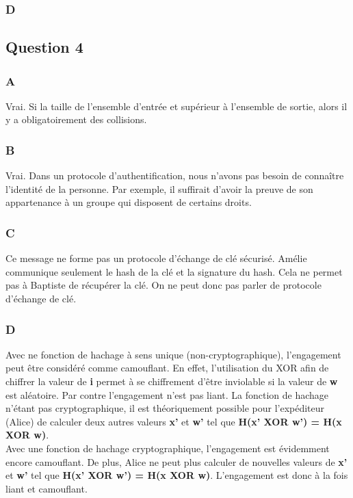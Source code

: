 \documentclass[a4paper, 11pt, oneside]{article}
\begin{document}
\subsubsection{D}

\subsection{Question 4}

\subsubsection{A}

Vrai. Si la taille de l’ensemble d'entrée et supérieur à l'ensemble de sortie, alors il y a obligatoirement des collisions. 

\subsubsection{B}

Vrai. Dans un protocole d’authentification, nous n'avons pas besoin de connaître l'identité de la personne. Par exemple, il suffirait d'avoir la preuve de son appartenance à un groupe qui disposent de certains droits. 

\subsubsection{C}

Ce message ne forme pas un protocole d'échange de clé sécurisé. Amélie communique seulement le hash de la clé et la signature du hash. Cela ne permet pas à Baptiste de récupérer la clé. On ne peut donc pas parler de protocole d'échange de clé.

\subsubsection{D}

Avec ne fonction de hachage à sens unique (non-cryptographique), l'engagement peut être considéré comme camouflant. En effet, l'utilisation du XOR afin de chiffrer la valeur de \textbf{i} permet à se chiffrement d'être inviolable si la valeur de \textbf{w} est aléatoire.
Par contre l'engagement n'est pas liant. La fonction de hachage n'étant pas cryptographique, il est théoriquement possible pour l’expéditeur (Alice) de calculer deux autres valeurs \textbf{x'} et \textbf{w'} tel que \textbf{H(x' XOR w') = H(x XOR w)}. 
\\[5pt]
Avec une fonction de hachage cryptographique, l'engagement est évidemment encore camouflant. De plus, Alice ne peut plus calculer de nouvelles valeurs de \textbf{x'} et \textbf{w'} tel que \textbf{H(x' XOR w') = H(x XOR w)}. L'engagement est donc à la fois liant et camouflant.
\end{document}
